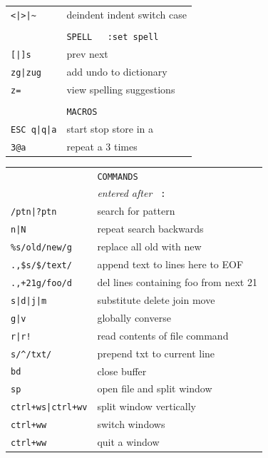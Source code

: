 \documentclass[a4paper,12pt]{article}
\begin{document}
\begin{multicols}{2}
\begin{tabular}{ll}
\texttt{<|>|\~}& deindent \textbar{} indent \textbar{} switch case\\
\\
&\texttt{SPELL\ \ \ :set spell}\\
\texttt{[|]s}&prev \textbar{} next\\
\texttt{zg|zug}&add \textbar{} undo to dictionary\\
\texttt{z=}&view spelling suggestions\\
\\
&\texttt{MACROS}\\
\texttt{ESC q|q|a}&start \textbar{} stop \textbar{} store in a\\
\texttt{3@a}&repeat a 3 times\\
\end{tabular}

\vfill

\begin{tabular}{ll}
&\texttt{COMMANDS}\\
&\emph{entered after }\texttt{ :}\\
\texttt{/ptn|?ptn}& search \textbar{} for pattern\\
\texttt{n|N}& repeat search \textbar{} backwards\\
\texttt{\%s/old/new/g}&replace all old with new\\
\texttt{.,\$s/\$/text/}&append text to lines here to EOF\\
\texttt{.,+21g/foo/d}&del lines containing foo from next 21\\
\texttt{s|d|j|m}&substitute \textbar{} delete \textbar{} join \textbar{}move\\
\texttt{g|v}& globally \textbar{} converse\\
\texttt{r|r!}& read contents of file \textbar{} command\\
\texttt{s/\^{}/txt/}&prepend txt to current line\\
\texttt{bd}&close buffer\\
\texttt{sp}&open file and split window\\
\texttt{ctrl+ws|ctrl+wv}&split window\textbar{} vertically\\
\texttt{ctrl+ww}&switch windows\\
\texttt{ctrl+ww}&quit a window\\
\end{tabular}


\end{multicols}
\end{document}
